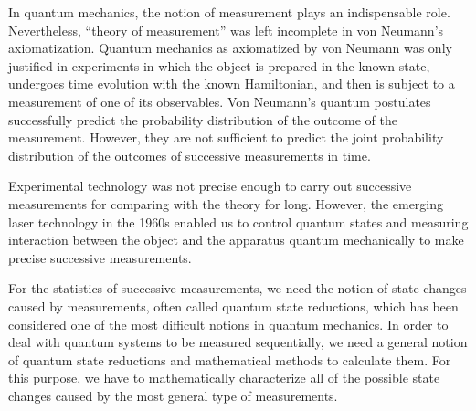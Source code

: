 \documentclass[12pt]{article}
\begin{document}
In quantum mechanics, the notion of measurement plays an indispensable role.
Nevertheless, ``theory of measurement'' was left incomplete in von Neumann's
axiomatization.
Quantum mechanics as axiomatized by von Neumann was only justified in 
experiments in which the object is prepared in the known state, undergoes time
evolution with the known Hamiltonian, and then is subject to a measurement
of one of its observables.  Von Neumann's quantum postulates successfully predict
the probability distribution of the outcome of the measurement. 
 However, they are not sufficient to predict the joint probability
distribution of the outcomes of successive measurements in time.

Experimental technology was not precise enough to carry out successive 
measurements for comparing with the theory for long.
However, the emerging laser technology in the 1960s
enabled us to control quantum states and measuring interaction between 
the object and the apparatus quantum mechanically to make 
precise successive measurements.

For  the statistics of successive measurements, we need the notion of state changes caused 
by measurements, often called quantum state reductions,
which has been considered one of the most difficult notions in quantum mechanics.
In order to deal with quantum systems to be measured sequentially, 
we need a general notion of quantum state reductions and mathematical methods
to calculate them.  For this purpose, we have to mathematically characterize 
all of the possible state changes caused by the most general type of measurements.
\end{document}
